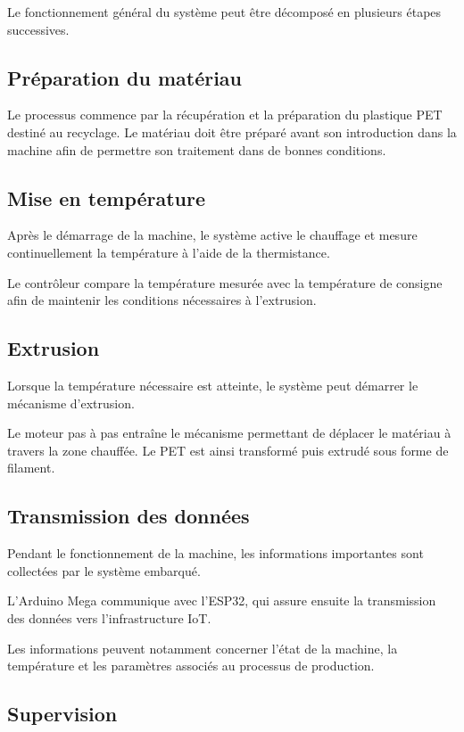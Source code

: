 Le fonctionnement général du système peut être décomposé en plusieurs
étapes successives.

\subsection{Préparation du matériau}

Le processus commence par la récupération et la préparation du plastique
PET destiné au recyclage. Le matériau doit être préparé avant son
introduction dans la machine afin de permettre son traitement dans de
bonnes conditions.

\subsection{Mise en température}

Après le démarrage de la machine, le système active le chauffage et mesure
continuellement la température à l'aide de la thermistance.

Le contrôleur compare la température mesurée avec la température de
consigne afin de maintenir les conditions nécessaires à l'extrusion.

\subsection{Extrusion}

Lorsque la température nécessaire est atteinte, le système peut démarrer
le mécanisme d'extrusion.

Le moteur pas à pas entraîne le mécanisme permettant de déplacer le
matériau à travers la zone chauffée. Le PET est ainsi transformé puis
extrudé sous forme de filament.

\subsection{Transmission des données}

Pendant le fonctionnement de la machine, les informations importantes
sont collectées par le système embarqué.

L'Arduino Mega communique avec l'ESP32, qui assure ensuite la transmission
des données vers l'infrastructure IoT.

Les informations peuvent notamment concerner l'état de la machine, la
température et les paramètres associés au processus de production.

\subsection{Supervision}

